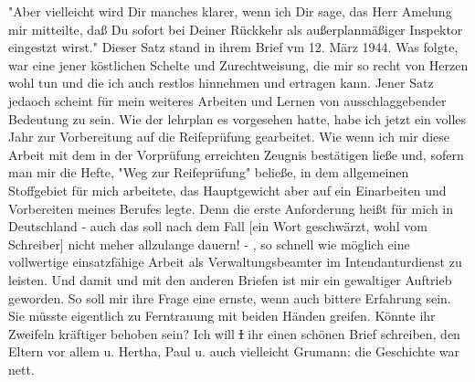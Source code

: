 \def\day{23. 6. 1944}
\mktitle

"Aber vielleicht wird Dir manches klarer, wenn ich Dir sage, das Herr Amelung mir mitteilte, da{\ss} Du sofort bei Deiner R\"{u}ckkehr als au{\ss}erplanm\"{a}{\ss}iger Inspektor eingestzt wirst."
Dieser Satz stand in ihrem Brief vm 12. M\"{a}rz 1944.
Was folgte, war eine jener k\"{o}stlichen Schelte und Zurechtweisung, die mir so recht von Herzen wohl tun und die ich auch restlos hinnehmen und ertragen kann.
Jener Satz jedaoch scheint f\"{u}r mein weiteres Arbeiten und Lernen von ausschlaggebender Bedeutung zu sein.
Wie der lehrplan es vorgesehen hatte, habe ich jetzt ein volles Jahr zur Vorbereitung auf die Reifepr\"{u}fung gearbeitet.
Wie wenn ich mir diese Arbeit mit dem in der Vorpr\"{u}fung erreichten Zeugnis best\"{a}tigen lie{\ss}e und, sofern man mir die Hefte, "Weg zur Reifepr\"{u}fung" belie{\ss}e, in dem allgemeinen Stoffgebiet f\"{u}r mich arbeitete, das Hauptgewicht aber auf ein Einarbeiten und Vorbereiten meines Berufes legte.
Denn die erste Anforderung hei{\ss}t f\"{u}r mich in Deutschland - auch das soll nach dem Fall {\color{red} [ein Wort geschw\"{a}rzt, wohl vom Schreiber] } nicht meher allzulange dauern! - , so schnell wie m\"{o}glich eine vollwertige einsatzf\"{a}hige Arbeit als Verwaltungsbeamter im Intendanturdienst zu leisten.
Und damit und mit den anderen Briefen ist mir ein gewaltiger Auftrieb geworden.
So soll mir ihre Frage eine ernste, wenn auch bittere Erfahrung sein.
Sie m\"{u}sste eigentlich zu Ferntrauung mit beiden H\"{a}nden greifen.
K\"{o}nnte ihr Zweifeln kr\"{a}ftiger behoben sein?
Ich will \st{I} ihr einen sch\"{o}nen Brief schreiben, den Eltern vor allem u. Hertha, Paul u. auch vielleicht Grumann: die Geschichte war nett.
\clearpage
